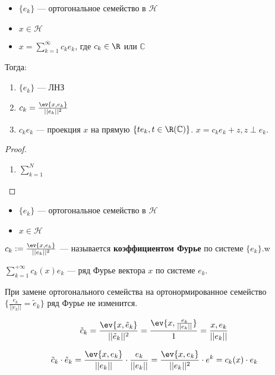 \begin{theorem}\itemfix
    \begin{itemize}
        \item \(\{e_k\}\) --- ортогональное семейство в \(\mathcal{H}\)
        \item \(x \in \mathcal{H}\)
        \item \(x = \sum_{k = 1}^{\overline{\infty}} c_k e_k\), где \(c_k \in \R\) или \(\mathbb{C}\)
    \end{itemize}

    Тогда:
    \begin{enumerate}
        \item \(\{e_k\}\) --- ЛНЗ
        \item \(c_k = \frac{\ev{x, e_k}}{||e_k||^2}\)
        \item \(c_k e_k\) --- проекция \(x\) на прямую \(\{t e_k, t \in \R (\mathbb{C})\}\). \(x = c_k e_k + z, z \perp e_k\).
    \end{enumerate}
\end{theorem}
\begin{proof}\itemfix
    \begin{enumerate}
        \item \(\sum_{k = 1}^N\) \unfinished %
    \end{enumerate}
\end{proof}

\begin{definition}\itemfix
    \begin{itemize}
        \item \(\{e_k\}\) --- ортогональное семейство в \(\mathcal{H}\)
        \item \(x \in \mathcal{H}\)
    \end{itemize}
    \(c_k := \frac{\ev{x, e_k}}{||e_k||^2}\) --- называется \textbf{коэффициентом Фурье} по системе \(\{e_k\}\).w

    \(\sum_{k = 1}^{+\infty} c_k(x) e_k\) --- ряд Фурье вектора \(x\) по системе \(e_k\).
\end{definition}

\begin{remark}
    При замене ортогонального семейства на ортонормированное семейство \(\{\frac{e_k}{||e_k||} = \tilde{e}_k\}\) ряд Фурье не изменится.

    \[\tilde{c}_k = \frac{\ev{x, \tilde{e}_k}}{||\tilde{e}_k||^2} = \frac{\ev{x, \frac{e_k}{||e_k||}}}{1} = \frac{x, e_k}{||e_k||}\]

    \[\tilde{c}_k \cdot \tilde{e}_k = \frac{\ev{x, e_k}}{||e_k||} \cdot \frac{e_k}{||e_k||} = \frac{\ev{x, e_k}}{||e_k||^2} \cdot e^k = c_k(x) \cdot e_k\]
\end{remark}

